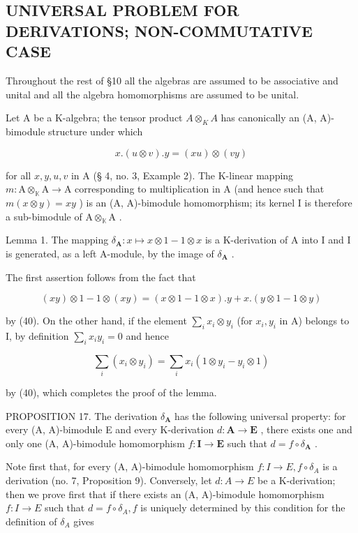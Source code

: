 \subsection{UNIVERSAL PROBLEM FOR DERIVATIONS; NON-COMMUTATIVE CASE}

Throughout the rest of §10 all the algebras are assumed to be associative and unital and all the algebra homomorphisms are assumed to be unital.

Let A be a K-algebra; the tensor product \(A \otimes_{K} A\) has canonically an (A, A)-bimodule structure under which

\[
x. (u \otimes v). y = (x u) \otimes (v y)\tag{40}
\]

for all \(x, y, u, v\) in A (§ 4, no. 3, Example 2). The K-linear mapping \(m: \mathrm{A} \otimes_{\mathbb{K}} \mathrm{A} \to \mathrm{A}\) corresponding to multiplication in A (and hence such that \(m(x \otimes y) = xy\) ) is an (A, A)-bimodule homomorphism; its kernel I is therefore a sub-bimodule of \(\mathrm{A} \otimes_{\mathbb{K}} \mathrm{A}\) .

Lemma 1. The mapping \(\delta_{\mathbf{A}}: x \mapsto x \otimes 1 - 1 \otimes x\) is a K-derivation of A into I and I is generated, as a left A-module, by the image of \(\delta_{\mathbf{A}}\) .

The first assertion follows from the fact that

\[
(x y) \otimes 1 - 1 \otimes (x y) = (x \otimes 1 - 1 \otimes x). y + x. (y \otimes 1 - 1 \otimes y)
\]

by (40). On the other hand, if the element \(\sum_{i} x_{i} \otimes y_{i}\) (for \(x_{i}, y_{i}\) in A) belongs to I, by definition \(\sum_{i} x_{i} y_{i} = 0\) and hence

\[
\sum_ {i} \left(x _ {i} \otimes y _ {i}\right) = \sum_ {i} x _ {i} (1 \otimes y _ {i} - y _ {i} \otimes 1)
\]

by (40), which completes the proof of the lemma.

PROPOSITION 17. The derivation \(\delta_{\mathbf{A}}\) has the following universal property: for every (A, A)-bimodule E and every K-derivation \(d: \mathbf{A} \to \mathbf{E}\) , there exists one and only one (A, A)-bimodule homomorphism \(f: \mathbf{I} \to \mathbf{E}\) such that \(d = f \circ \delta_{\mathbf{A}}\) .

Note first that, for every (A, A)-bimodule homomorphism \(f: I \to E, f \circ \delta_{A}\) is a derivation (no. 7, Proposition 9). Conversely, let \(d: A \to E\) be a K-derivation; then we prove first that if there exists an (A, A)-bimodule homomorphism \(f: I \to E\) such that \(d = f \circ \delta_{A}, f\) is uniquely determined by this condition for the definition of \(\delta_{A}\) gives

